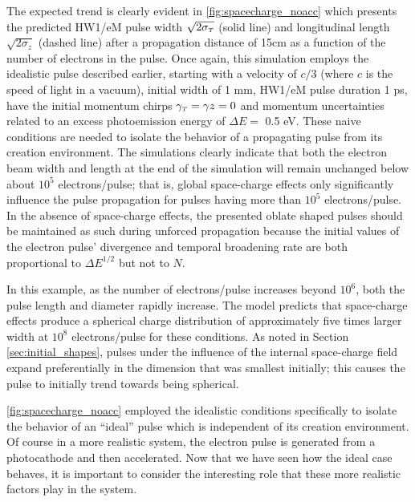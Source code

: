 The expected trend is clearly evident in \ref{fig:spacecharge_noacc} which presents the predicted HW1/eM pulse width $\sqrt{2 \sigma_{{\scriptscriptstyle T}}}$ (solid line) and longitudinal length $\sqrt{2 \sigma_{z}}$ (dashed line) after a propagation distance of 15cm as a function of the number of electrons in the pulse.
Once again, this simulation employs the idealistic pulse described earlier, starting with a velocity of $c/3$ (where $c$ is the speed of light in a vacuum), initial width of 1 mm, HW1/eM pulse duration 1 ps, have the initial momentum chirps $\gamma_{{\scriptscriptstyle T}} = \gamma{z} = 0 $ and momentum uncertainties related to an excess photoemission energy of $\Delta E = $ 0.5 eV.
These naive conditions are needed to isolate the behavior of a propagating pulse from its creation environment.
The simulations clearly indicate that both the electron beam width and length at the end of the simulation will remain unchanged below about $10^5$ electrons/pulse; that is, global space-charge effects only significantly influence the pulse propagation for pulses having more than $10^5$ electrons/pulse.
In the absence of space-charge effects, the presented oblate shaped pulses should be maintained as such during unforced propagation because the initial values of the electron pulse' divergence and temporal broadening rate are both proportional to $\Delta E^{1/2}$ but not to $N$.


In this example, as the number of electrons/pulse increases beyond $10^6$, both the pulse length and diameter rapidly increase.
The model predicts that space-charge effects produce a spherical charge distribution of approximately five times larger width at $10^8$ electrons/pulse for these conditions.
As noted in Section \ref{sec:initial_shapes}, pulses under the influence of the internal space-charge field expand preferentially in the dimension that was smallest initially; this causes the pulse to initially trend towards being spherical.

\ref{fig:spacecharge_noacc} employed the idealistic conditions specifically to isolate the behavior of an ``ideal'' pulse which is independent of its creation environment.
Of course in a more realistic system, the electron pulse is generated from a photocathode and then accelerated.
Now that we have seen how the ideal case behaves, it is important to consider the interesting role that these more realistic factors play in the system.

